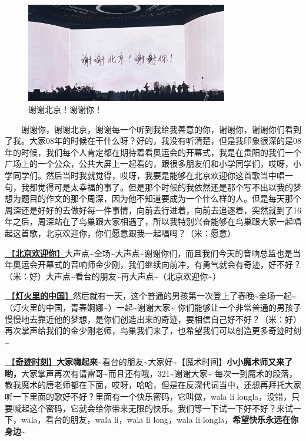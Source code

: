 \documentclass[]{ctexbook}
\begin{document}
\begin{figure}

{\centering \includegraphics[width=250pt]{img/beijing20240921/thank-beijing} 

}

\caption{谢谢北京！谢谢你！}\label{fig:unnamed-chunk-97}
\end{figure}

  谢谢你，谢谢北京，谢谢每一个听到我给我善意的你，谢谢你，谢谢你们看到了我。大家08年的时候在干什么呀？好的，我没有听清楚，但是我印象很深的是08年的时候，我们每个人肯定都在期待着看奥运会的开幕式，我是在贵阳的我们一个广场上的一个公众，公共大屏上一起看的，跟很多朋友们和小学同学们，哎呀，小学同学们。然后当时我就觉得，哎呀，我要是能够在北京欢迎你这首歌当中唱一句，我都觉得可是太幸福的事了。但是那个时候的我依然还是那个写不出以我的梦想为题目的作文的那个周深，因为他不知道要成为一个什么样的人。但是每天那个周深还是好好的去做好每一件事情，向前去行进着，向前去追逐着，突然就到了16年之后，周深站在了鸟巢跟大家相遇了，所以我特别兴奋能够在鸟巢跟大家一起唱起这首歌，北京欢迎你，你们愿意跟我一起唱吗？（米：愿意）

\hyperref[welcome-to-beijing]{🎵【\textbf{北京欢迎你}】}大声点\textasciitilde 全场\textasciitilde 大声点\textasciitilde 谢谢你们，而且我们今天的音响总监也是当年奥运会开幕式的音响师金少刚，我们继续向前冲，有勇气就会有奇迹，好不好？（米：好）大声点\textasciitilde 看台的朋友\textasciitilde 再大声点\textasciitilde（北京欢迎你\textasciitilde）

\hyperref[China-in-the-light]{🎵【\textbf{灯火里的中国}】}然后就有一天，这个普通的男孩第一次登上了春晚\textasciitilde 全场一起\textasciitilde（灯火里的中国，青春婀娜\textasciitilde）一起\textasciitilde 谢谢大家\textasciitilde{}
你们能够让一个非常普通的男孩子慢慢地去靠近他的梦想，是你们创造出来的奇迹，要相信自己好不好？（米：好）再次掌声给我们的金少刚老师，鸟巢我们来了，也希望我们可以创造更多奇迹时刻\textasciitilde{}

\hyperref[magic-moment]{🎵【\textbf{奇迹时刻}】}\textbf{大家嗨起来\textasciitilde{}}看台的朋友\textasciitilde 大家好\textasciitilde【魔术时间】\textbf{小小魔术师又来了哟，}大家掌声再次有请雷哥\textasciitilde 而且还有哦，321\textasciitilde 谢谢大家\textasciitilde{}
每次一到魔术的段落，教我魔术的唐老师都在下面，哎呀，哈哈，但是在反深代词当中，还想再拜托大家听一下里面的歌好不好？里面有一个快乐密码，它叫做，wala li longla，没错，只要喊起这个密码，它就会给你带来无限的快乐。我们等一下试一下好不好？来试一下，wala，看台的朋友，wala li，wala li long，wala li longla，\textbf{希望快乐永远在你身边\textasciitilde{}}
\end{document}
